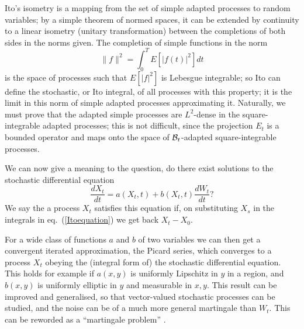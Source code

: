 Ito's isometry is a mapping from the set of simple adapted processes
to random variables; by a simple theorem of normed spaces, it
can be extended by continuity to a linear isometry
(unitary transformation) between the completions of both sides in the
norms given. The completion of simple functions in the norm
\begin{equation}
\|f\|^2=\int_0^TE[|f(t)|^2]dt
\end{equation}
is the space of processes such that $E[|f|^2]$ is Lebesgue integrable; so
Ito can define the stochastic, or Ito integral, of all processes with this
property; it is the limit in this norm of simple adapted processes
approximating it. Naturally, we must prove that the adapted simple processes
are $L^2$-dense in the square-integrable adapted processes; this is not
difficult, since the projection $E_t$ is a bounded operator and maps onto
the space of ${\cal B}_t$-adapted square-integrable processes.

We can now give a meaning to the question, do there exist solutions to the
stochastic differential equation
\begin{equation}
\frac{dX_t}{dt}=a(X_t,t)+b(X_t,t)\frac{dW_t}{dt}?
\label{sde}
\end{equation}
We say the a process $X_t$ satisfies this equation if, on substituting
$X_s$ in the integrals in eq.~(\ref{Itoequation}) we get back $X_t-X_0$.
 
For a wide class of functions $a$ and $b$ of two variables we can then
get a convergent iterated approximation, the Picard series, which converges
to a process $X_t$ obeying the (integral form of) the stochastic
differential equation. This holds for example if $a(x,y)$ is
uniformly Lipschitz in $y$ in a region, and $b(x,y)$ is uniformly elliptic
in $y$ and measurable in $x,y$.
This result can be improved and generalised, so
that vector-valued stochastic processes can be studied, and the noise
can be of a much more general martingale than $W_t$.
This can be reworded as a ``martingale problem'' \cite{Stroock}.


